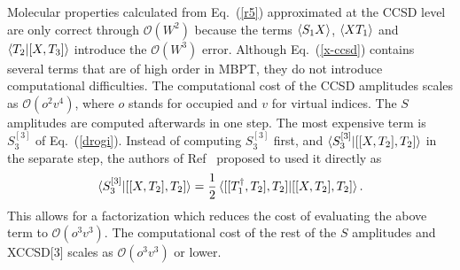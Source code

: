 \documentclass[preprint,12pt]{elsarticle}
\newcommand{\equ}[1]{\begin{equation} #1 \end{equation}}
\newcommand{\fr}[1]{Eq.~(\ref{#1})}
\newcommand{\mt}[1]{\mbox{\tiny{#1}}}
\begin{document}
Molecular properties calculated from \fr{r5} approximated at the CCSD level
 are only correct through  $\mathscr{O}(W^2)$ because the  terms
$\braket{S_1X}$, $\braket{XT_1}$  and  $\braket{T_2|[X, T_3]}$ 
introduce the $\mathscr{O}(W^3)$ error. 
Although \fr{x-ccsd} contains several terms that are of high
order in MBPT,   they do not introduce computational difficulties.\cite{korona2006one}  
The computational cost of the CCSD amplitudes scales as $\mathscr{O}(o^2v^4)$,
where $o$ stands for occupied and $v$ for virtual indices.
The $S$ amplitudes are computed afterwards in one step. The most expensive term is $S_3^{[3]}$ of \fr{drogi}.
Instead of computing $S_3^{[3]}$ first,
and $\braket{S_3^{[3]}|[[X, T_2], T_2]}$ in the separate step,
the authors of Ref~\citep{korona2006one}  proposed to
used  it directly as
\equ{\braket{S_3^{[3]}|[[X, T_2], T_2]} = \frac12\braket{[[T_1^\dagger, T_2], T_2]|[[X, T_2], T_2]}.
}
This allows for a factorization which reduces the 
 cost of evaluating the above term to $\mathscr{O}(o^3v^3)$.
The computational cost of the rest of the $S$ amplitudes and XCCSD[3]  scales as $\mathscr{O}(o^3v^3)$ or lower.
\end{document}
